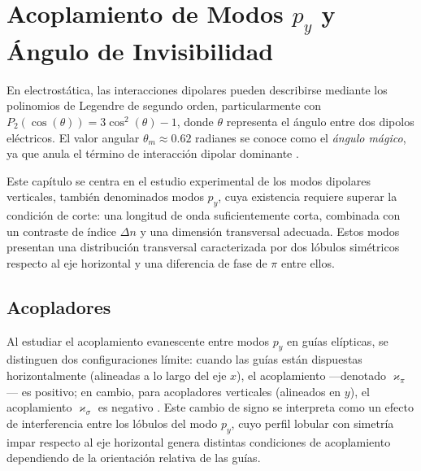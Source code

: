 \chapter{Acoplamiento de Modos $p_y$ y Ángulo de Invisibilidad \label{cap:invisibility}}
En electrostática, las interacciones dipolares pueden describirse mediante los polinomios de Legendre de segundo orden, particularmente con $P_2(\cos(\theta))=3\cos^2(\theta)-1$, donde $\theta$ representa el ángulo entre dos dipolos eléctricos. El valor angular $\theta_m
\approx 0.62$ radianes se conoce como el \textit{ángulo mágico}, ya que anula el término de interacción dipolar dominante \citep{medmagic}.

Este capítulo se centra en el estudio experimental de los modos dipolares verticales, también denominados modos $p_y$, cuya existencia requiere superar la condición de corte: una longitud de onda suficientemente corta, combinada con un contraste de índice $\Delta n$ y una dimensión transversal adecuada. Estos modos presentan una distribución transversal caracterizada por dos lóbulos simétricos respecto al eje horizontal y una diferencia de fase de $\pi$ entre ellos.

\section{Acopladores}

Al estudiar el acoplamiento evanescente entre modos $p_y$ en guías elípticas, se distinguen dos configuraciones límite: cuando las guías están dispuestas horizontalmente (alineadas a lo largo del eje $x$), el acoplamiento —denotado $\varkappa_\pi$— es positivo; en cambio, para acopladores verticales (alineados en $y$), el acoplamiento $\varkappa_\sigma$ es negativo \citep{Pmodecoupling}. Este cambio de signo se interpreta como un efecto de interferencia entre los lóbulos del modo $p_y$, cuyo perfil lobular con simetría impar respecto al eje horizontal genera distintas condiciones de acoplamiento dependiendo de la orientación relativa de las guías.

